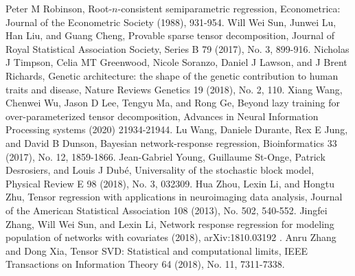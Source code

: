 \documentclass[11pt]{article}
\theoremstyle{exampstyle}
\theoremstyle{definition}
\begin{document}
{\begin{thebibliography}{9}
Peter M Robinson, Root-$n$-consistent semiparametric regression, Econometrica: Journal of the Econometric Society (1988), 931-954.
Will Wei Sun, Junwei Lu, Han Liu, and Guang Cheng, Provable sparse tensor decomposition, Journal of Royal Statistical Association Society, Series B 79 (2017), No. 3, 899-916.
Nicholas J Timpson, Celia MT Greenwood, Nicole Soranzo, Daniel J Lawson, and J Brent Richards, Genetic architecture: the shape of the genetic contribution to human traits and disease, Nature Reviews Genetics 19 (2018), No. 2, 110.
Xiang Wang, Chenwei Wu, Jason D Lee, Tengyu Ma, and Rong Ge, Beyond lazy training for over-parameterized tensor decomposition, Advances in Neural Information Processing systems (2020) 21934-21944.
Lu Wang, Daniele Durante, Rex E Jung, and David B Dunson, Bayesian network-response regression, Bioinformatics 33 (2017), No. 12, 1859-1866.
Jean-Gabriel Young, Guillaume St-Onge, Patrick Desrosiers, and Louis J Dub\'e, Universality of the stochastic block model, Physical Review E 98 (2018), No. 3, 032309.
Hua Zhou, Lexin Li, and Hongtu Zhu, Tensor regression with applications in neuroimaging data analysis, Journal of the American Statistical Association 108 (2013), No. 502, 540-552.
Jingfei Zhang, Will Wei Sun, and Lexin Li, Network response regression for modeling population of networks with covariates (2018), arXiv:1810.03192 .
Anru Zhang and Dong Xia, Tensor SVD: Statistical and computational limits, IEEE Transactions on Information Theory 64 (2018), No. 11, 7311-7338.
\end{thebibliography}
}
\end{document}
